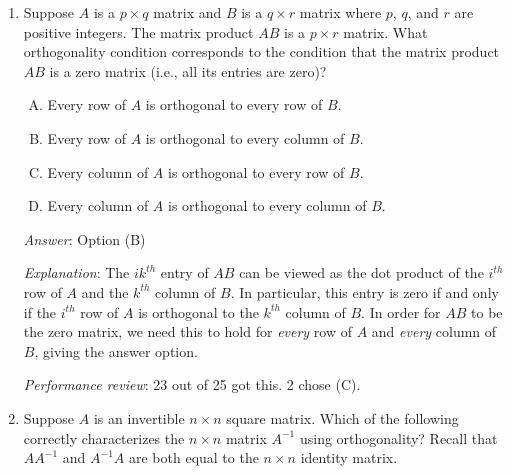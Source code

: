\documentclass[10pt]{amsart}
\begin{document}
\begin{enumerate}
  {\em Answer}: Option (A)

  {\em Explanation}: $A\vec{x}$ is a $n \times 1$ matrix (i.e., a
  column vector with $n$ coordinates) and its $i^{th}$ entry is the
  dot product of the $i^{th}$ row of $A$ and the vector $\vec{x}$,
  both of which are $m$-dimensional vectors. This is zero if and only
  if the $i^{th}$ row of $A$ and the vector $\vec{x}$ are orthogonal
  to each other. In order to have $A\vec{x} = \vec{0}$, we need
  $\vec{x}$ to be orthogonal to all the rows of $A$.

  {\em Performance review}: 17 out of 25 got this. 8 chose (B).

\item Suppose $A$ is a $p \times q$ matrix and $B$ is a $q \times r$
  matrix where $p$, $q$, and $r$ are positive integers. The matrix
  product $AB$ is a $p \times r$ matrix. What orthogonality condition
  corresponds to the condition that the matrix product $AB$ is a zero
  matrix (i.e., all its entries are zero)?

  \begin{enumerate}[(A)]
  \item Every row of $A$ is orthogonal to every row of $B$.
  \item Every row of $A$ is orthogonal to every column of $B$.
  \item Every column of $A$ is orthogonal to every row of $B$.
  \item Every column of $A$ is orthogonal to every column of $B$.
  \end{enumerate}

  {\em Answer}: Option (B)

  {\em Explanation}: The $ik^{th}$ entry of $AB$ can be viewed as the
  dot product of the $i^{th}$ row of $A$ and the $k^{th}$ column of
  $B$. In particular, this entry is zero if and only if the $i^{th}$
  row of $A$ is orthogonal to the $k^{th}$ column of $B$. In order for
  $AB$ to be the zero matrix, we need this to hold for {\em every} row
  of $A$ and {\em every} column of $B$, giving the answer option.

  {\em Performance review}: 23 out of 25 got this. 2 chose (C).
\item Suppose $A$ is an invertible $n \times n$ square matrix. Which
  of the following correctly characterizes the $n \times n$ matrix
  $A^{-1}$ using orthogonality? Recall that $AA^{-1}$ and $A^{-1}A$
  are both equal to the $n \times n$ identity matrix.


\end{enumerate}
\end{document}
